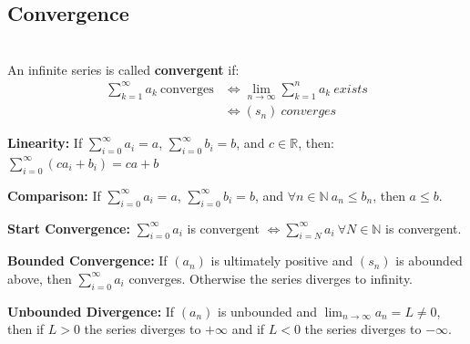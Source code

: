 \documentclass[8pt,a4paper]{extarticle}     %
\theoremstyle{definition}
\theoremstyle{definition}
\theoremstyle{definition}
\newcommand{\R}{\mathbb{R}}
\newcommand{\N}{\mathbb{N}}
\begin{document}
\begin{multicols}{4}
\subsection{Convergence}
\begin{boxdefinition}[Convergence] \ \\
	An infinite series is called \textbf{convergent} if:
	\[
	\begin{split}
		\sum_{k=1}^\infty a_k \ \text{converges} &\Leftrightarrow \lim_{n\to\infty}\sum_{k=1}^n a_k \ \textit{exists}\\
		&\Leftrightarrow (s_n) \ \textit{converges}
	\end{split}
	\]
\end{boxdefinition}
\begin{eqlist}
	\item \textbf{Linearity: }
	If $\sum_{i=0}^\infty a_i=a$, $\sum_{i=0}^\infty b_i = b$, and $c\in\R$, then: $\sum_{i=0}^\infty (c a_i+b_i) = ca+b$
	\item \textbf{Comparison:} If $\sum_{i=0}^\infty a_i=a$, $\sum_{i=0}^\infty b_i = b$, and $\forall n\in\N \ a_n\leq b_n $, then $a\leq b$.
	\item \textbf{Start Convergence:} $\sum_{i=0}^\infty a_i$ is convergent $\Leftrightarrow \sum_{i=N}^\infty a_i \ \forall N\in\N$ is convergent.
	\item \textbf{Bounded Convergence:} If $(a_n)$ is ultimately positive and $(s_n)$ is abounded above, then $\sum_{i=0}^\infty a_i$ converges. Otherwise the series diverges to infinity.
	\item \textbf{Unbounded Divergence:} If $(a_n)$ is unbounded and $\lim_{n\to\infty} a_n=L\neq 0$, then if $L>0$ the series diverges to $+\infty$ and if $L<0$ the series diverges to $-\infty$.
\end{eqlist}


\end{multicols}
\end{document}
